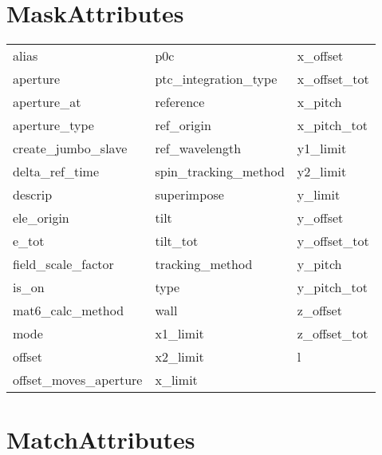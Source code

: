  \section{MaskAttributes}
 \label{s:list.mask}
 
 \begin{tabular}{lll} \toprule
alias                       & p0c                         & x_offset                    \\
aperture                    & ptc_integration_type        & x_offset_tot                \\
aperture_at                 & reference                   & x_pitch                     \\
aperture_type               & ref_origin                  & x_pitch_tot                 \\
create_jumbo_slave          & ref_wavelength              & y1_limit                    \\
delta_ref_time              & spin_tracking_method        & y2_limit                    \\
descrip                     & superimpose                 & y_limit                     \\
ele_origin                  & tilt                        & y_offset                    \\
e_tot                       & tilt_tot                    & y_offset_tot                \\
field_scale_factor          & tracking_method             & y_pitch                     \\
is_on                       & type                        & y_pitch_tot                 \\
mat6_calc_method            & wall                        & z_offset                    \\
mode                        & x1_limit                    & z_offset_tot                \\
offset                      & x2_limit                    & l                           \\
offset_moves_aperture       & x_limit                     &                             \\
 \bottomrule
 \end{tabular}
 \vfill
 
 \section{MatchAttributes}
 \label{s:list.match}
 
